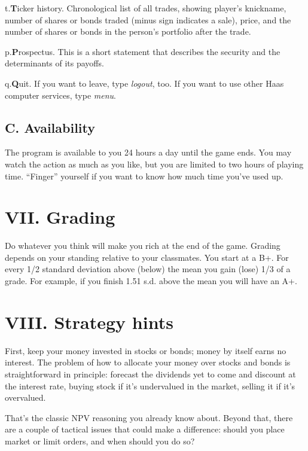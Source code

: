 \item{t.}{\bf T}icker history.
Chronological list of all trades, showing player's knickname, number
of shares or bonds traded (minus sign indicates a sale), price, and
the number of shares or bonds in the person's portfolio after the
trade.

\item{p.}{\bf P}rospectus.
This is a short statement that describes the security and the
determinants of its payoffs.

\item{q.}{\bf Q}uit.
If you want to leave, type {\it logout}, too.  If you want to use
other Haas computer services, type {\it menu}.

\subsection{C. Availability}%
The program is available to you 24 hours a day until the game ends.
You may watch the action as much as you like, but you are limited to
two hours of playing time.  ``Finger'' yourself if you want to know
how much time you've used up.

\section{VII. Grading}%
Do whatever you think will make you rich at the end of the game.
Grading depends on your standing relative to your classmates.  You
start at a B+.  For every 1/2 standard deviation%
above
(below) the mean you gain (lose) 1/3 of a grade.  For example, if you
finish 1.51 s.d. above the mean you will have an A+.

\section{VIII. Strategy hints}%
First, keep your money invested in stocks or bonds; money by itself
earns no interest.  The problem of how to allocate your money over
stocks and bonds is straightforward in principle: forecast the
dividends yet to come and discount at the interest rate, buying stock
if it's undervalued in the market, selling it if it's overvalued.

That's the classic NPV reasoning you already know about.  Beyond that, there
are a couple of tactical issues that could make a difference: should you
place market or limit orders, and when should you do so?

